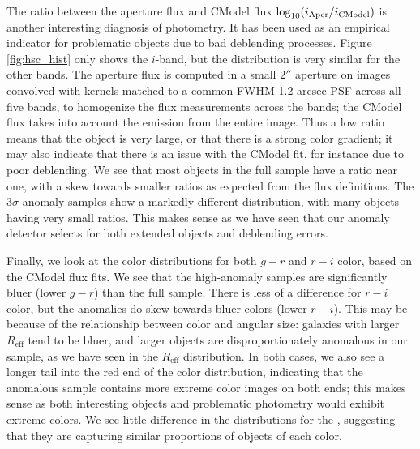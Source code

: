 The ratio between the aperture flux and CModel flux $\log_{10} (i_{\rm Aper}/i_{\rm CModel})$ is another interesting diagnosis of photometry. 
It has been used as an empirical indicator for problematic objects due to bad deblending processes.
Figure \ref{fig:hsc_hist} only shows the $i$-band, but the distribution is very similar for the other bands.
The aperture flux is computed in a small $2''$ aperture on images convolved with kernels matched to a common FWHM-1.2 arcsec PSF across all five bands, to homogenize the flux measurements across the bands; the CModel flux takes into account the emission from the entire image. 
Thus a low ratio means that the object is very large, or that there is a strong color gradient; it may also indicate that there is an issue with the CModel fit, for instance due to poor deblending.
We see that most objects in the full sample have a ratio near one, with a skew towards smaller ratios as expected from the flux definitions.
The $3\sigma$ anomaly samples show a markedly different distribution, with many objects having very small ratios.
This makes sense as we have seen that our anomaly detector selects for both extended objects and deblending errors.

Finally, we look at the color distributions for both $g-r$ and $r-i$ color, based on the CModel flux fits.
We see that the high-anomaly samples are significantly bluer (lower $g-r$) than the full sample.
There is less of a difference for $r-i$ color, but the anomalies do skew towards bluer colors (lower $r-i$).
This may be because of the relationship between color and angular size: galaxies with larger $R_\mathrm{eff}$ tend to be bluer, and larger objects are disproportionately anomalous in our sample, as we have seen in the $R_\mathrm{eff}$ distribution.
In both cases, we also see a longer tail into the red end of the color distribution, indicating that the anomalous sample contains more extreme color images on both ends; this makes sense as both interesting objects and problematic photometry would exhibit extreme colors.
We see little difference in the distributions for the , suggesting that they are capturing similar proportions of objects of each color.

